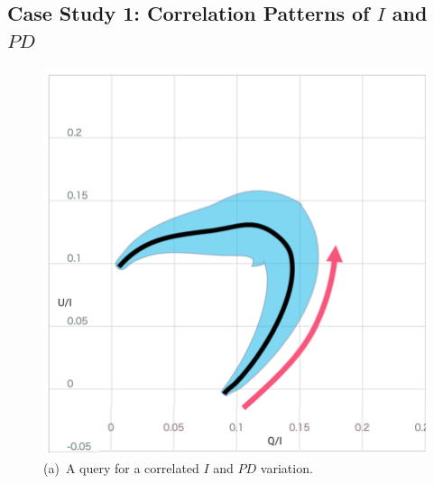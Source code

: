 
\subsection{Case Study 1: Correlation Patterns of $I$ and $PD$}\label{sec:correlate}
\begin{figure}[tb]
    \centering
    \begin{minipage}{0.49\linewidth}
        \centering
        \includegraphics[width=.9\linewidth]{vgtc_journal_latex/figures/QBScorrelate.png}\\
        \footnotesize{\sf(a)~A query for a correlated $I$ and $PD$ variation.}\\
    \end{minipage}
    \begin{minipage}{0.49\linewidth}
        \centering

\end{minipage}
\end{figure}
